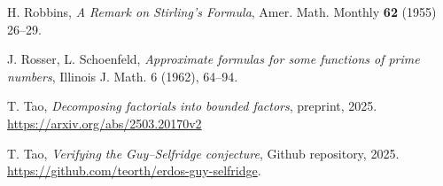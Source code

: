 \documentclass[12pt,a4paper,reqno]{amsart}
\numberwithin{equation}{section}
\theoremstyle{plain}
\theoremstyle{definition}
\begin{document}
\begin{thebibliography}{10}
H. Robbins, \emph{A Remark on Stirling's Formula}, Amer. Math. Monthly \textbf{62} (1955) 26--29.


J. Rosser, L. Schoenfeld, \emph{Approximate formulas for some functions of prime numbers}, Illinois J. Math. 6 (1962), 64--94.

T. Tao, \emph{Decomposing factorials into bounded factors}, preprint, 2025. \url{https://arxiv.org/abs/2503.20170v2}

T. Tao, \emph{Verifying the Guy--Selfridge conjecture}, Github repository, 2025.  \url{https://github.com/teorth/erdos-guy-selfridge}.

\end{thebibliography}
\end{document}
